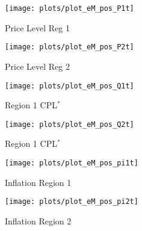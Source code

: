 \documentclass[../thesis.tex]{subfiles}
\begin{document}
\begin{figure}[h!]
	\begin{subfigure}[b]{0.27\textwidth}
		\centering
		\texttt{[image: plots/plot\_eM\_pos\_P1t]}
		\caption{\scriptsize Price Level Reg 1}
		\label{fig:ZMt-P1t}
	\end{subfigure}
	\hspace*{0.5cm}
	\begin{subfigure}[b]{0.27\textwidth}
		\centering
		\texttt{[image: plots/plot\_eM\_pos\_P2t]}
		\caption{\scriptsize Price Level Reg 2}
		\label{fig:ZMt-P2t}
	\end{subfigure}
	\hspace*{0.5cm}
	\begin{subfigure}[b]{0.27\textwidth}
		\centering
		\texttt{[image: plots/plot\_eM\_pos\_Q1t]}
		\caption{\scriptsize Region 1 CPL$^{\ast}$}
		\label{fig:ZMt-Q1t}
	\end{subfigure}
	\vspace*{0.1cm}
	\begin{subfigure}[b]{0.27\textwidth}
		\centering
		\texttt{[image: plots/plot\_eM\_pos\_Q2t]}
		\caption{\scriptsize Region 1 CPL$^{\ast}$}
		\label{fig:ZMt-Q2t}
	\end{subfigure}
	\hspace*{0.5cm}
	\begin{subfigure}[b]{0.27\textwidth}
		\centering
		\texttt{[image: plots/plot\_eM\_pos\_pi1t]}
		\caption{\scriptsize Inflation Region 1}
		\label{fig:ZMt-pi1t}
	\end{subfigure}
	\hspace*{0.5cm}
	\begin{subfigure}[b]{0.27\textwidth}
		\centering
		\texttt{[image: plots/plot\_eM\_pos\_pi2t]}
		\caption{\scriptsize Inflation Region 2}
		\label{fig:ZMt-pi2t}
	\end{subfigure}
	\vspace*{0.1cm}
	\begin{subfigure}[b]{0.27\textwidth}

\end{subfigure}
\end{figure}
\end{document}
